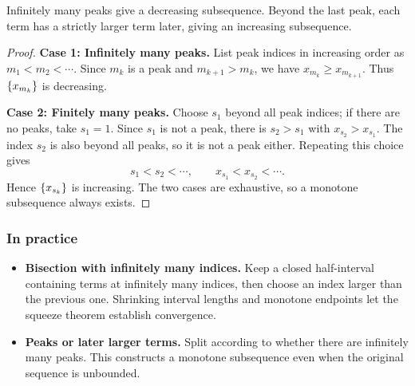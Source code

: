 \begin{idea}
    Infinitely many peaks give a decreasing subsequence. Beyond the last
    peak, each term has a strictly larger term later, giving an increasing
    subsequence.
\end{idea}
\begin{proof}
    \textbf{Case 1: Infinitely many peaks.}
    List peak indices in increasing order as $m_1<m_2<\cdots$.
    Since $m_k$ is a peak and $m_{k+1}>m_k$, we have
    $x_{m_k}\geq x_{m_{k+1}}$. Thus $\left\{x_{m_k}\right\}$ is decreasing.

    \textbf{Case 2: Finitely many peaks.}
    Choose $s_1$ beyond all peak indices; if there are no peaks, take
    $s_1=1$. Since $s_1$ is not a peak, there is $s_2>s_1$ with
    $x_{s_2}>x_{s_1}$. The index $s_2$ is also beyond all peaks, so it is
    not a peak either. Repeating this choice gives
    \[
        s_1<s_2<\cdots,
        \qquad x_{s_1}<x_{s_2}<\cdots.
    \]
    Hence $\left\{x_{s_k}\right\}$ is increasing. The two cases are exhaustive,
    so a monotone subsequence always exists.
\end{proof}

\subsubsection*{In practice}
\begin{itemize}
    \item \textbf{Bisection with infinitely many indices.} Keep a closed
    half-interval containing terms at infinitely many indices, then choose
    an index larger than the previous one. Shrinking interval lengths and
    monotone endpoints let the squeeze theorem establish convergence.
    \item \textbf{Peaks or later larger terms.} Split according to whether
    there are infinitely many peaks. This constructs a monotone subsequence
    even when the original sequence is unbounded.
\end{itemize}
